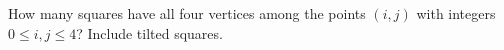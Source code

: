 How many squares have all four vertices among the points $(i,j)$ with integers $0\le i,j\le4$? Include tilted squares.
